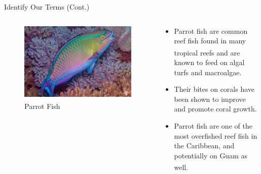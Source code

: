 \documentclass{beamer}
\begin{document}
\begin{frame}{Identify Our Terms (Cont.)}
    \begin{columns}
        \begin{column}{0.5\textwidth}
            \begin{figure}
                \centering
                \includegraphics[width=1\textwidth]{Latex/Figures/parrot_fish.jpg}
                \caption{Parrot Fish\textsuperscript{\cite{img_parrot_fish}}}
                \label{fig:my_label}
            \end{figure}
        \end{column}
        \begin{column}{0.5\textwidth}
            \begin{itemize}
                \item Parrot fish are common reef fish found in many tropical reefs\textsuperscript{\cite{13_blackwood_hastings_mumby_2010}} and are known to feed on algal turfs and macroalgae.
                \item Their bites on corals have been shown to improve and promote coral growth.
                \item Parrot fish are one of the most overfished reef fish in the Caribbean, and potentially on Guam as well\textsuperscript{\cite{13_blackwood_hastings_mumby_2010}}.
            \end{itemize}
        \end{column}
    \end{columns}
\end{frame}


\end{document}
